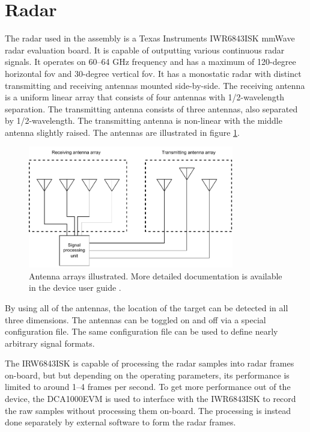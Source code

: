\section{Radar}
\label{sec:2-radar}
The radar used in the assembly is a Texas Instruments IWR6843ISK mmWave radar evaluation board.
It is capable of outputting various continuous radar signals.
It operates on 60--64 GHz frequency and has a maximum of 120-degree horizontal \gls{fov} and 30-degree vertical \gls{fov}.
It has a monostatic radar with distinct transmitting and receiving antennas mounted side-by-side.
The receiving antenna is a uniform linear array that consists of four antennas with 1/2-wavelength separation.
The transmitting antenna consists of three antennas, also separated by 1/2-wavelength.
The transmitting antenna is non-linear with the middle antenna slightly raised.
The antennas are illustrated in figure \ref{fig:antennas}.

\begin{figure}[H]
    \centering
    \includegraphics[width=0.8\textwidth]{fig/3/antennas.pdf}
    \caption{Antenna arrays illustrated. More detailed documentation is available in the device user guide \cite{ti-iwr-user-guide}.}
    \label{fig:antennas}
\end{figure}

By using all of the antennas,
the location of the target can be detected in all three dimensions.
The antennas can be toggled on and off via a special configuration file.
The same configuration file can be used to define nearly arbitrary signal formats. \cite{mmwave-sdk-user-guide}

The IRW6843ISK is capable of processing the radar samples into radar frames on-board,
but but depending on the operating parameters,
its performance is limited to around 1--4 frames per second.
To get more performance out of the device,
the DCA1000EVM is used to interface with the IWR6843ISK to record the raw samples without processing them on-board.
The processing is instead done separately by external software to form the radar frames.

